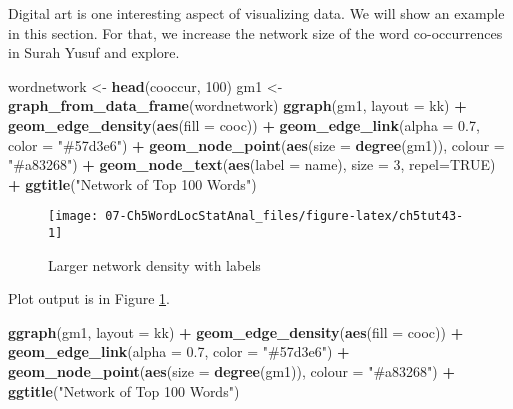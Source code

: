 \documentclass[
]{article}
\newenvironment{Shaded}{\begin{snugshade}}{\end{snugshade}}
\newcommand{\AttributeTok}[1]{\textcolor[rgb]{0.13,0.29,0.53}{#1}}
\newcommand{\ConstantTok}[1]{\textcolor[rgb]{0.56,0.35,0.01}{#1}}
\newcommand{\DecValTok}[1]{\textcolor[rgb]{0.00,0.00,0.81}{#1}}
\newcommand{\FloatTok}[1]{\textcolor[rgb]{0.00,0.00,0.81}{#1}}
\newcommand{\FunctionTok}[1]{\textcolor[rgb]{0.13,0.29,0.53}{\textbf{#1}}}
\newcommand{\NormalTok}[1]{#1}
\newcommand{\OtherTok}[1]{\textcolor[rgb]{0.56,0.35,0.01}{#1}}
\newcommand{\SpecialCharTok}[1]{\textcolor[rgb]{0.81,0.36,0.00}{\textbf{#1}}}
\newcommand{\StringTok}[1]{\textcolor[rgb]{0.31,0.60,0.02}{#1}}
\begin{document}
Digital art is one interesting aspect of visualizing data. We will show an example in this section. For that, we increase the network size of the word co-occurrences in Surah Yusuf and explore.

\begin{Shaded}
\begin{Highlighting}[]
\NormalTok{wordnetwork }\OtherTok{\textless{}{-}} \FunctionTok{head}\NormalTok{(cooccur, }\DecValTok{100}\NormalTok{)}
\NormalTok{gm1 }\OtherTok{\textless{}{-}} \FunctionTok{graph\_from\_data\_frame}\NormalTok{(wordnetwork)}
\FunctionTok{ggraph}\NormalTok{(gm1, }\AttributeTok{layout =} \StringTok{\textquotesingle{}kk\textquotesingle{}}\NormalTok{) }\SpecialCharTok{+} 
      \FunctionTok{geom\_edge\_density}\NormalTok{(}\FunctionTok{aes}\NormalTok{(}\AttributeTok{fill =}\NormalTok{ cooc)) }\SpecialCharTok{+} 
      \FunctionTok{geom\_edge\_link}\NormalTok{(}\AttributeTok{alpha =} \FloatTok{0.7}\NormalTok{, }\AttributeTok{color =} \StringTok{"\#57d3e6"}\NormalTok{) }\SpecialCharTok{+}
      \FunctionTok{geom\_node\_point}\NormalTok{(}\FunctionTok{aes}\NormalTok{(}\AttributeTok{size =} \FunctionTok{degree}\NormalTok{(gm1)), }\AttributeTok{colour =} \StringTok{"\#a83268"}\NormalTok{) }\SpecialCharTok{+}
      \FunctionTok{geom\_node\_text}\NormalTok{(}\FunctionTok{aes}\NormalTok{(}\AttributeTok{label =}\NormalTok{ name), }\AttributeTok{size =} \DecValTok{3}\NormalTok{, }\AttributeTok{repel=}\ConstantTok{TRUE}\NormalTok{) }\SpecialCharTok{+}
      \FunctionTok{ggtitle}\NormalTok{(}\StringTok{"Network of Top 100 Words"}\NormalTok{)}
\end{Highlighting}
\end{Shaded}

\begin{figure}

{\centering \texttt{[image: 07-Ch5WordLocStatAnal\_files/figure-latex/ch5tut43-1]} 

}

\caption{Larger network density with labels}\label{fig:ch5tut43}
\end{figure}

Plot output is in Figure \ref{fig:ch5tut43}.

\begin{Shaded}
\begin{Highlighting}[]
\FunctionTok{ggraph}\NormalTok{(gm1, }\AttributeTok{layout =} \StringTok{\textquotesingle{}kk\textquotesingle{}}\NormalTok{) }\SpecialCharTok{+} 
      \FunctionTok{geom\_edge\_density}\NormalTok{(}\FunctionTok{aes}\NormalTok{(}\AttributeTok{fill =}\NormalTok{ cooc)) }\SpecialCharTok{+} 
      \FunctionTok{geom\_edge\_link}\NormalTok{(}\AttributeTok{alpha =} \FloatTok{0.7}\NormalTok{, }\AttributeTok{color =} \StringTok{"\#57d3e6"}\NormalTok{) }\SpecialCharTok{+}
      \FunctionTok{geom\_node\_point}\NormalTok{(}\FunctionTok{aes}\NormalTok{(}\AttributeTok{size =} \FunctionTok{degree}\NormalTok{(gm1)),}
                      \AttributeTok{colour =} \StringTok{"\#a83268"}\NormalTok{) }\SpecialCharTok{+}
      \FunctionTok{ggtitle}\NormalTok{(}\StringTok{"Network of Top 100 Words"}\NormalTok{)}
\end{Highlighting}
\end{Shaded}
\end{document}
